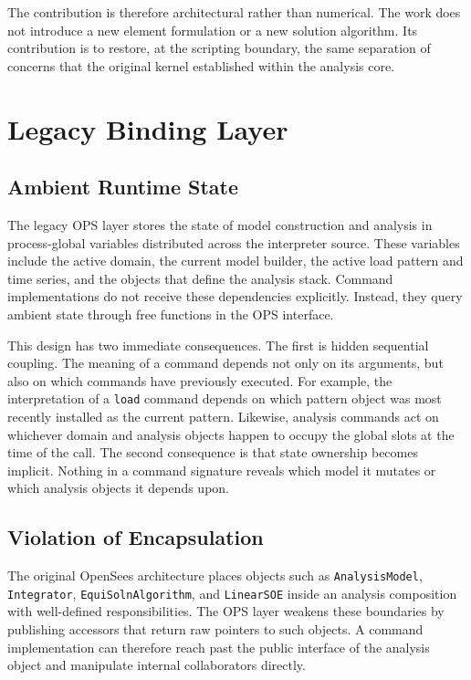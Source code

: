 The contribution is therefore architectural rather than numerical.
The work does not introduce a new element formulation or a new solution
algorithm.
Its contribution is to restore, at the scripting boundary, the same
separation of concerns that the original kernel established within the
analysis core.



\section{Legacy Binding Layer}

\subsection{Ambient Runtime State}

The legacy OPS layer stores the state of model construction and analysis
in process-global variables distributed across the interpreter source.
These variables include the active domain, the current model builder,
the active load pattern and time series, and the objects that define the
analysis stack.
Command implementations do not receive these dependencies explicitly.
Instead, they query ambient state through free functions in the OPS
interface.

This design has two immediate consequences.
The first is hidden sequential coupling.
The meaning of a command depends not only on its arguments, but also on
which commands have previously executed.
For example, the interpretation of a \texttt{load} command depends on
which pattern object was most recently installed as the current pattern.
Likewise, analysis commands act on whichever domain and analysis objects
happen to occupy the global slots at the time of the call.
The second consequence is that state ownership becomes implicit.
Nothing in a command signature reveals which model it mutates or which
analysis objects it depends upon.

\subsection{Violation of Encapsulation}

The original OpenSees architecture places objects such as
\texttt{AnalysisModel}, \texttt{Integrator},
\texttt{EquiSolnAlgorithm}, and \texttt{LinearSOE} inside an analysis
composition with well-defined responsibilities.
The OPS layer weakens these boundaries by publishing accessors that
return raw pointers to such objects.
A command implementation can therefore reach past the public interface of
the analysis object and manipulate internal collaborators directly.

